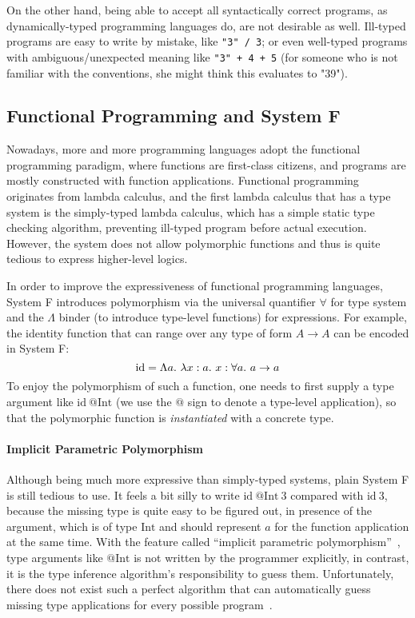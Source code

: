On the other hand, being able to accept all syntactically correct programs,
as dynamically-typed programming languages do,
are not desirable as well.
Ill-typed programs are easy to write by mistake, like \verb|"3" / 3|;
or even well-typed programs with ambiguous/unexpected meaning like \verb|"3" + 4 + 5|
(for someone who is not familiar with the conventions, she might think this evaluates to "39").


\subsection{Functional Programming and System F}
Nowadays, more and more programming languages adopt the functional programming paradigm,
where functions are first-class citizens,
and programs are mostly constructed with function applications.
Functional programming originates from lambda calculus,
and the first lambda calculus that has a type system is the
simply-typed lambda calculus, which has a simple static type checking algorithm,
preventing ill-typed program before actual execution.
However, the system does not allow polymorphic functions and
thus is quite tedious to express higher-level logics.

In order to improve the expressiveness of functional programming languages,
System F introduces polymorphism via the universal quantifier $\forall$ for type system
and the $\Lambda$ binder (to introduce type-level functions) for expressions.
For example, the identity function that can range over any type of form $A \to A$
can be encoded in System F:
$$\text{id} = \Lambda a.~\lam[x:a]x : \all a \to a$$
To enjoy the polymorphism of such a function,
one needs to first supply a type argument like $\text{id}~@\text{Int}$
(we use the $@$ sign to denote a type-level application),
so that the polymorphic function is \emph{instantiated} with
a concrete type.

\paragraph{Implicit Parametric Polymorphism}

Although being much more expressive than simply-typed systems,
plain System F is still tedious to use.
It feels a bit silly to write $\text{id}~@\text{Int}~3$ compared with $\text{id}~3$,
because the missing type is quite easy to be figured out,
in presence of the argument, which is of type $\text{Int}$ and
should represent $a$ for the function application at the same time.
With the feature called ``implicit parametric polymorphism''~\citep{reynolds1983types},
type arguments like $@\text{Int}$ is not written by the programmer explicitly,
in contrast, it is the type inference algorithm's responsibility to guess them.
Unfortunately, there does not exist such a perfect algorithm that
can automatically guess missing type applications for every possible program~\citep{tiuryn1996subtyping}.

